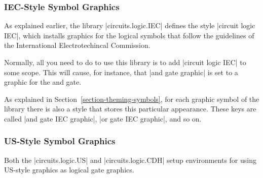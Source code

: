 \subsubsection{IEC-Style Symbol Graphics}

As explained earlier, the library |circuits.logic.IEC| defines the
style |circuit logic IEC|, which installs graphics for the
logical symbols that follow the guidelines of the International
Electrotechincal Commission.

Normally, all you need to do to use this library is to add
|circuit logic IEC| to some scope. This will cause, for instance, that
|and gate graphic| is set to a graphic for the and gate.

As explained in Section~\ref{section-theming-symbols}, for each
graphic symbol of the library there is also a style that stores this
particular appearance. These keys are called |and gate IEC graphic|,
|or gate IEC graphic|, and so on.


\begin{codeexample}[]
\end{codeexample}


\subsubsection{US-Style Symbol Graphics}

Both the |circuits.logic.US| and |circuits.logic.CDH| setup
environments for using US-style graphics as logical gate graphics.

